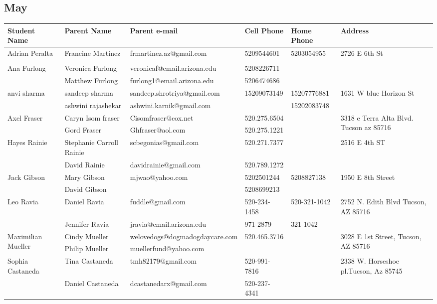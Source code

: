 \documentclass[landscape]{article}\usepackage[]{graphicx}\usepackage[]{color}
\begin{document}
\subsection{May}
\begin{longtable}{|p{100pt}|p{100pt}|p{140pt}|p{60pt}|p{64pt}|p{120pt}|}
\textbf{Student Name} & \textbf{Parent Name} & \textbf{Parent e-mail} & \textbf{Cell Phone} & \textbf{Home Phone} & \textbf{Address}\\
\hline
\hline
\multirow{2}{100pt}{Adrian Peralta} & Francine Martinez & frmartinez.az@gmail.com & 5209544601 & 5203054955 & \multirow{2}{120pt}{2726 E 6th St} \\
 &  &  &  &  & \\
\hline
\multirow{2}{100pt}{Ana Furlong} & Veronica Furlong & veronicaf@email.arizona.edu & 5208226711 &  & \multirow{2}{120pt}{} \\
 & Matthew Furlong & furlong1@email.arizona.edu & 5206474686 &  & \\
\hline
\multirow{2}{100pt}{anvi sharma} & sandeep sharma & sandeep.shrotriya@gmail.com & 15209073149 & 15207776881 & \multirow{2}{120pt}{1631 W blue Horizon St} \\
 & ashwini rajashekar & ashwini.karnik@gmail.com &  & 15202083748 & \\
\hline
\multirow{2}{100pt}{Axel Fraser } & Caryn Isom fraser & Cisomfraser@cox.net & 520.275.6504 &  & \multirow{2}{120pt}{3318 e Terra Alta Blvd. Tucson az 85716 } \\
 & Gord Fraser  & Ghfraser@aol.com & 520.275.1221 &  & \\
\hline
\multirow{2}{100pt}{Hayes Rainie} & Stephanie Carroll Rainie & scbegonias@gmail.com & 520.271.7377 &  & \multirow{2}{120pt}{2516 E 4th ST} \\
 & David Rainie & davidrainie@gmail.com & 520.789.1272 &  & \\
\hline
\multirow{2}{100pt}{Jack Gibson} & Mary Gibson & mjwao@yahoo.com & 5202501244 & 5208827138 & \multirow{2}{120pt}{1950 E 8th Street} \\
 & David Gibson &  & 5208699213 &  & \\
\hline
\multirow{2}{100pt}{Leo Ravia} & Daniel Ravia & fuddle@gmail.com & 520-234-1458 & 520-321-1042 & \multirow{2}{120pt}{2752 N. Edith Blvd Tucson, AZ 85716} \\
 & Jennifer Ravia & jravia@email.arizona.edu & 971-2879 & 321-1042 & \\
\hline
\multirow{2}{100pt}{Maximilian Mueller} & Cindy Mueller & welovedogs@dogmadogdaycare.com & 520.465.3716 &  & \multirow{2}{120pt}{3028 E 1st Street, Tucson, AZ 85716} \\
 & Philip Mueller & muellerfund@yahoo.com &  &  & \\
\hline
\multirow{2}{100pt}{Sophia Castaneda} & Tina Castaneda & tmh82179@gmail.com & 520-991-7816 &  & \multirow{2}{120pt}{2338 W. Horseshoe pl.Tucson, Az 85745} \\
 & Daniel Castaneda & dcastanedarx@gmail.com & 520-237-4341 &  & \\
\hline
\end{longtable}
\newpage
\end{document}
